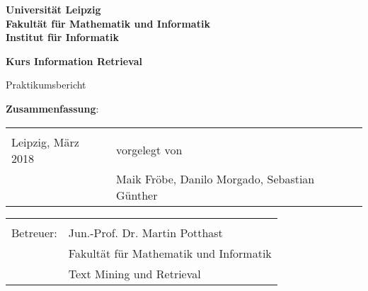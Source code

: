 \documentclass[a4paper,ngerman,twoside,BCOR1.5cm,headsepline,DIV12,appendixprefix,final,12pt]{scrartcl}
\begin{document}
\thispagestyle{empty}

\begin{center}
\large

\vspace{1cm}
\textbf{\sffamily	Universität Leipzig\\
			Fakultät für Mathematik und Informatik\\
			Institut für Informatik\\}

\vspace{2cm}
{\Large\textbf{\sffamily Kurs Information Retrieval}}


\large

Praktikumsbericht
\vspace{1cm}
\end{center}

\textbf{Zusammenfassung}:\\
\label{sec:intro}


\vfill

{\large
\begin{tabular}{p{7cm} l}
&\\
\small
Leipzig, März 2018 		& \small vorgelegt von\\
				& \small Maik Fröbe, Danilo Morgado, Sebastian Günther\\
\end{tabular}}

\begin{tabular}{p{7cm} l}
&\\
\small
Betreuer: 	& \small Jun.-Prof. Dr. Martin Potthast \\
				& \small Fakultät für Mathematik und Informatik\\
				& \small Text Mining und Retrieval
\end{tabular}


\newpage


\newpage


\newpage


\newpage
{}


\end{document}

